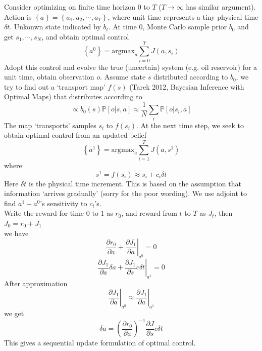 \documentclass[a4paper,onecolumn]{article}
\begin{document}
\setcounter{page}{1}

\title{}
\author{}
\date{}
\maketitle

Consider optimizing on finite time horizon $0$ to $T$
($T\rightarrow\infty$ has similar argument). Action is
$\left\{a\right\} = \left\{a_1, a_2, \cdots, a_T\right\}$,
where unit time represents a tiny physical time $\delta t$.
Unkonwn state indicated by $b_t$.
At time $0$, Monte Carlo sample prior $b_0$ and get $s_1,\cdots,s_N$, and obtain optimal control
\begin{equation*}
    \left\{a^0\right\} = \textrm{argmax}_a \sum_{i=0}^T J(a,s_i)
\end{equation*}
Adopt this control and evolve the true (uncertain) system (e.g. oil
reservoir) for a unit time, obtain
observation $o$.
Assume state $s$ distributed according to $b_0$, we try to find out a
`transport map' $f(s)$ (Tarek 2012, Bayesian Inference with Optimal
Maps) that distributes according to
$$
\propto b_0(s)
\mathbb{P}[o|s,a]\approx \frac{1}{N}\sum_i \mathbb{P}[o|s_i, a]
$$
The map `transports' samples $s_i$ to $f(s_i)$.
At the next time step, we seek to obtain optimal control from an updated
belief
\begin{equation*}
    \left\{a^1\right\} = \textrm{argmax}_a \sum_{i=1}^T J(a,s^1)
\end{equation*}
where
$$
s^1 = f(s_i) \approx s_i + c_i\delta t
$$
Here $\delta t$ is the physical time increment. This is based on the
assumption that information `arrives gradually' (sorry for the poor
wording).
We use adjoint to find $a^1-a^0$'s sensitivity to $c_i$'s.\\
Write the reward for time $0$ to $1$ as $r_0$, and reward from $t$ to
$T$ as $J_t$, then
$J_0 = r_0 + J_1$\\
we have
\begin{equation}
    \left.\frac{\partial r_0}{\partial a} + \frac{\partial J_1}{\partial
	a}\right|_{a^0} = 0
	\label{eq1}
\end{equation}
\begin{equation}
    \left.\frac{\partial J_1}{\partial a}\delta a + \frac{\partial J_1}{\partial
	s} c \delta t \right|_{a^1} = 0
	\label{eq2}
\end{equation}
After approximation
$$
\left.\frac{\partial J_1}{\partial a}\right|_{a^0} \approx
\left.\frac{\partial J_1}{\partial a}\right|_{a^1}
$$
we get
\begin{equation}
    \delta a = \left(\frac{\partial r_0}{\partial
	a}\right)^{-1}\frac{\partial J}{\partial s}c \delta t
\end{equation}
This gives a sequential update formulation of optimal control.
\end{document}
